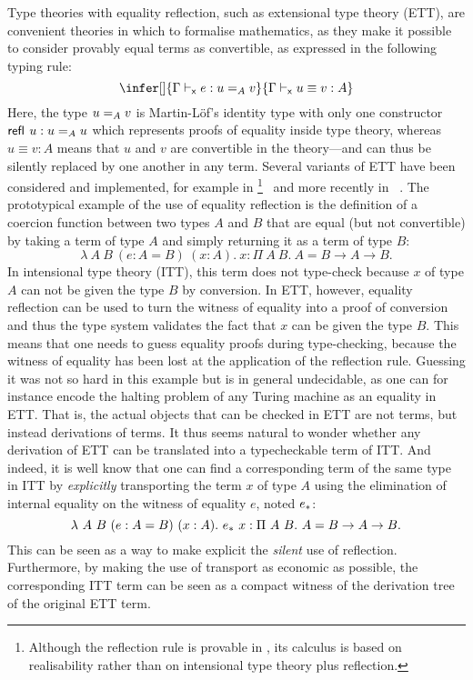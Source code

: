 Type theories with equality reflection, such as extensional type
theory (ETT), are convenient theories in which to formalise
mathematics, as they make it possible to consider provably equal terms as
convertible, as expressed in the following typing rule:
%
\begin{equation}
  \label{eq:reflection}
  \infer[]
    {\xisterm{\Ga}{e}{\Eq{A}{u}{v}}}
    {\xeqterm{\Ga}{u}{v}{A}}
\end{equation}
%
Here, the type $\Eq{A}{u}{v}$ is Martin-Löf's identity type with only
one constructor $\refl{} u : \Eq{A}{u}{u}$ which represents
proofs of equality inside type theory, whereas $u \equiv v : A$ means
that $u$ and $v$ are convertible in the theory---and can thus be
silently replaced by one another in any term.
%
Several variants of ETT have been considered and implemented, for
example in \NuPRL\footnote{Although the reflection rule is provable in \NuPRL,
its calculus is based on realisability rather than on intensional type theory
plus reflection.}~\cite{DBLP:conf/cade/AllenCEKL00} and more recently in
\Andromeda~\cite{andromeda}.
%
The prototypical example of the use of equality reflection is the
definition of a coercion function between two types $A$ and $B$ that
are equal (but not convertible) by taking a term of type $A$ and
simply returning it as a term of type $B$:
\[
\lambda\ A\ B \ (e:A = B)\ (x:A).\ x
: \Pi\ A\ B.\ A = B \to A \to B.
\]
%
%
In intensional type theory (ITT), this term does not type-check
because $x$ of type $A$ can not be given the type $B$ by conversion.
%
In ETT, however, equality reflection can be used to turn the witness
of equality into a proof of conversion and thus the type system
validates the fact that $x$ can be given the type $B$.
%
This means that one needs to guess equality proofs
during type-checking, because the witness of equality has been lost at
the application of the reflection rule. Guessing it was not so hard in this
example but is in general undecidable, as one can for instance encode the
halting problem of any Turing machine as an equality in ETT.
%
That is, the actual objects that can be checked in ETT are not terms,
but instead derivations of terms.
%
It thus seems natural to wonder whether any derivation of ETT can be
translated into a typecheckable term of ITT.
%
And indeed, it is well know that one can find a corresponding term of
the same type in ITT by \emph{explicitly} transporting the term $x$
of type $A$ using the elimination of internal equality on the witness
of equality $e$, noted $\translpo{e}$:
%
\[
  \lambda\ A\ B \ (e:A = B)\ (x:A).\ \translpo{e}\ x
  : \Pi\ A\ B.\ A = B \to A \to B.
\]
%
This can be seen as a way to make explicit the \emph{silent} use of
reflection.
%
Furthermore, by making the use of transport as economic as possible,
the corresponding ITT term can be seen as a compact witness of the
derivation tree of the original ETT term.


